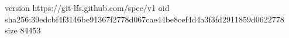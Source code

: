 version https://git-lfs.github.com/spec/v1
oid sha256:39edcbf4f3146be91367f2778d067cae44be8cef4d4a3f3fd2911859d0622778
size 84453
